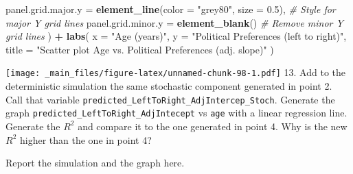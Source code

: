 \documentclass[
]{book}
\newenvironment{Shaded}{\begin{snugshade}}{\end{snugshade}}
\newcommand{\AttributeTok}[1]{\textcolor[rgb]{0.13,0.29,0.53}{#1}}
\newcommand{\CommentTok}[1]{\textcolor[rgb]{0.56,0.35,0.01}{\textit{#1}}}
\newcommand{\FloatTok}[1]{\textcolor[rgb]{0.00,0.00,0.81}{#1}}
\newcommand{\FunctionTok}[1]{\textcolor[rgb]{0.13,0.29,0.53}{\textbf{#1}}}
\newcommand{\NormalTok}[1]{#1}
\newcommand{\SpecialCharTok}[1]{\textcolor[rgb]{0.81,0.36,0.00}{\textbf{#1}}}
\newcommand{\StringTok}[1]{\textcolor[rgb]{0.31,0.60,0.02}{#1}}
\begin{document}
\begin{Shaded}
\begin{Highlighting}[]
    \AttributeTok{panel.grid.major.y =} \FunctionTok{element\_line}\NormalTok{(}\AttributeTok{color =} \StringTok{"grey80"}\NormalTok{, }\AttributeTok{size =} \FloatTok{0.5}\NormalTok{), }\CommentTok{\# Style for major Y grid lines}
    \AttributeTok{panel.grid.minor.y =} \FunctionTok{element\_blank}\NormalTok{() }\CommentTok{\# Remove minor Y grid lines}
\NormalTok{  ) }\SpecialCharTok{+}
  \FunctionTok{labs}\NormalTok{(}
    \AttributeTok{x =} \StringTok{"Age (years)"}\NormalTok{,}
    \AttributeTok{y =} \StringTok{"Political Preferences (left to right)"}\NormalTok{,}
    \AttributeTok{title =} \StringTok{"Scatter plot Age vs. Political Preferences (adj. slope)"}
\NormalTok{  )}
\end{Highlighting}
\end{Shaded}

\texttt{[image: \_main\_files/figure-latex/unnamed-chunk-98-1.pdf]}
13. Add to the deterministic simulation the same stochastic component generated in point 2. Call that variable \texttt{predicted\_LeftToRight\_AdjIntercep\_Stoch}. Generate the graph \texttt{predicted\_LeftToRight\_AdjIntecept} vs \texttt{age} with a linear regression line. Generate the \(R^2\) and compare it to the one generated in point 4. Why is the new \(R^2\) higher than the one in point 4?

Report the simulation and the graph here.
\end{document}
